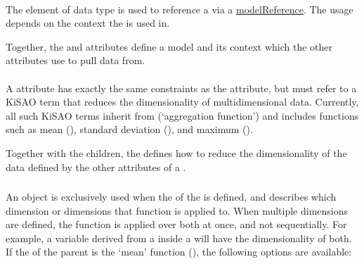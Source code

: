 \paragraph*{}
\label{sec:modelReferenceAttribute}
The  element of data type \SIdRef is used to reference a \Model via a \hyperref[sec:modelReference]{modelReference}. The usage depends on the context the \Variable is used in.

Together, the  and  attributes define a model and its context which the other attributes use to pull data from.


\paragraph*{}
\label{sec:dimensionTerm}
A  attribute has exactly the same constraints as the  attribute, but must refer to a KiSAO term that reduces the dimensionality of multidimensional data.  Currently, all such KiSAO terms inherit from  (`aggregation function') and includes functions such as mean (), standard deviation (), and maximum ().

Together with the \AppliedDimension children, the  defines how to reduce the dimensionality of the data defined by the other attributes of a \Variable.



\subsubsection{}
\label{class:appliedDimension}
\label{class:listOfAppliedDimensions}

An \AppliedDimension object is exclusively used when the  of the \Variable is defined, and describes which dimension or dimensions that function is applied to.  When multiple dimensions are defined, the function is applied over both at once, and not sequentially.  For example, a variable derived from a \Task inside a \RepeatedTask will have the dimensionality of both.  If the  of the parent \Variable is the `mean' function (), the following options are available:

